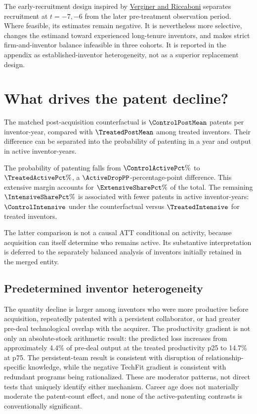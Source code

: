 \documentclass[10pt,a4paper]{article}
\begin{document}
The early-recruitment design inspired by
\href{https://www.nature.com/articles/s41599-025-04894-w}
{Verginer and Riccaboni} separates recruitment at \(t=-7,-6\) from the later
pre-treatment observation period. Where feasible, its estimates remain
negative. It is nevertheless more selective, changes the estimand toward
experienced long-tenure inventors, and makes strict firm-and-inventor balance
infeasible in three cohorts. It is reported in the appendix as
established-inventor heterogeneity, not as a superior replacement design.

\section{What drives the patent decline?}

The matched post-acquisition counterfactual is \(\ControlPostMean\) patents
per inventor-year, compared with \(\TreatedPostMean\) among treated inventors.
Their difference can be separated into the probability of patenting in a year
and output in active inventor-years.



The probability of patenting falls from \(\ControlActivePct\%\) to
\(\TreatedActivePct\%\), a \(\ActiveDropPP\)-percentage-point difference.
This extensive margin accounts for \(\ExtensiveSharePct\%\) of the total.
The remaining \(\IntensiveSharePct\%\) is associated with fewer patents in
active inventor-years: \(\ControlIntensive\) under the counterfactual versus
\(\TreatedIntensive\) for treated inventors.

The latter comparison is not a causal ATT conditional on activity, because
acquisition can itself determine who remains active. Its substantive
interpretation is deferred to the separately balanced analysis of inventors
initially retained in the merged entity.

\subsection{Predetermined inventor heterogeneity}



The quantity decline is larger among inventors who were more productive
before acquisition, repeatedly patented with a persistent collaborator, or
had greater pre-deal technological overlap with the acquirer. The productivity
gradient is not only an absolute-stock arithmetic result: the predicted loss
increases from approximately 4.4\% of pre-deal output at the treated
productivity p25 to 14.7\% at p75. The persistent-team result is consistent
with disruption of relationship-specific knowledge, while the negative
TechFit gradient is consistent with redundant programs being rationalized.
These are moderator patterns, not direct tests that uniquely identify either
mechanism. Career age does not materially moderate the patent-count effect,
and none of the active-patenting contrasts is conventionally significant.
\end{document}

